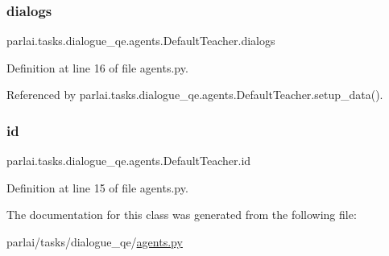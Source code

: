 \subsubsection{\texorpdfstring{dialogs}{dialogs}}
{\footnotesize\ttfamily parlai.\+tasks.\+dialogue\+\_\+qe.\+agents.\+Default\+Teacher.\+dialogs}



Definition at line 16 of file agents.\+py.



Referenced by parlai.\+tasks.\+dialogue\+\_\+qe.\+agents.\+Default\+Teacher.\+setup\+\_\+data().

\mbox{\label{classparlai_1_1tasks_1_1dialogue__qe_1_1agents_1_1DefaultTeacher_a8f8ccd686c7a9b8e92a0de772b13a55b}} 
\subsubsection{\texorpdfstring{id}{id}}
{\footnotesize\ttfamily parlai.\+tasks.\+dialogue\+\_\+qe.\+agents.\+Default\+Teacher.\+id}



Definition at line 15 of file agents.\+py.



The documentation for this class was generated from the following file\+:\begin{DoxyCompactItemize}
\item 
parlai/tasks/dialogue\+\_\+qe/\hyperlink{parlai_2tasks_2dialogue__qe_2agents_8py}{agents.\+py}\end{DoxyCompactItemize}
